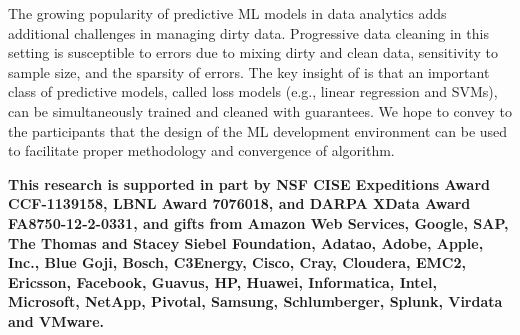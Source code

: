 The growing popularity of predictive ML models in data analytics adds additional challenges in managing dirty data.
Progressive data cleaning in this setting is susceptible to errors due to mixing dirty and clean data, sensitivity to sample size, and the sparsity of errors.
The key insight of \sys is that an important class of predictive models, called loss models (e.g., linear regression and SVMs), can be simultaneously trained and cleaned with guarantees.
We hope to convey to the participants that the design of the ML development environment can be used to facilitate proper methodology and convergence of algorithm.

\textbf{\small This research is supported in part by NSF CISE Expeditions Award CCF-1139158, LBNL Award 7076018, and DARPA XData Award FA8750-12-2-0331, and gifts from Amazon Web Services, Google, SAP, The Thomas and Stacey Siebel Foundation, Adatao, Adobe, Apple, Inc., Blue Goji, Bosch, C3Energy, Cisco, Cray, Cloudera, EMC2, Ericsson, Facebook, Guavus, HP, Huawei, Informatica, Intel, Microsoft, NetApp, Pivotal, Samsung, Schlumberger, Splunk, Virdata and VMware.}
